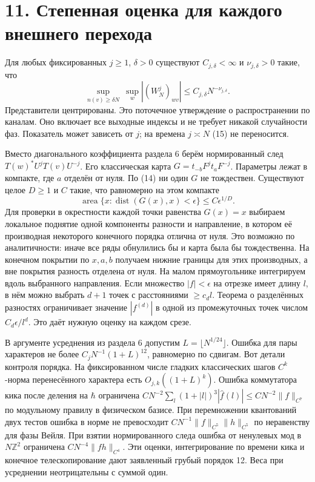 \documentclass[11pt,a4paper]{article}
\newcommand{\sect}[1]{\section*{\sffamily\color{ink}#1}}
\begin{document}
\newpage
\sect{11. Степенная оценка для каждого внешнего перехода}
Для любых фиксированных $j\ge1$, $\delta>0$ существуют $C_{j,\delta}<\infty$ и $\nu_{j,\delta}>0$ такие, что
\[
 \boxed{\sup_{n(v)\ge\delta N}\ \sup_w |(W_N^j)_{wv}|
       \le C_{j,\delta}N^{-\nu_{j,\delta}}.}                              \tag{15}
\]
Представители центрированы. Это поточечное утверждение о распространении по каналам. Оно включает все выходные индексы и не требует никакой случайности фаз. Показатель может зависеть от $j$; на времена $j\asymp N$ (15) не переносится.

Вместо диагонального коэффициента раздела 6 берём нормированный след $T(w)^*U^jT(v)U^{-j}$. Его классическая карта $G=t_{-b}F^jt_a F^{-j}$. Параметры лежат в компакте, где $a$ отделён от нуля. По (14) ни один $G$ не тождествен. Существуют целое $D\ge1$ и $C$ такие, что равномерно на этом компакте
\[
 \operatorname{area}\{x:\operatorname{dist}(G(x),x)<\epsilon\}
 \le C\epsilon^{1/D}.
\]
Для проверки в окрестности каждой точки равенства $G(x)=x$ выбираем локальное поднятие одной компоненты разности и направление, в котором её производная некоторого конечного порядка отлична от нуля. Это возможно по аналитичности: иначе все ряды обнулились бы и карта была бы тождественна. На конечном покрытии по $x,a,b$ получаем нижние границы для этих производных, а вне покрытия разность отделена от нуля. На малом прямоугольнике интегрируем вдоль выбранного направления. Если множество $|f|<\epsilon$ на отрезке имеет длину $l$, в нём можно выбрать $d+1$ точек с расстояниями $\ge c_d l$. Теорема о разделённых разностях ограничивает значение $|f^{(d)}|$ в одной из промежуточных точек числом $C_d\epsilon/l^d$. Это даёт нужную оценку на каждом срезе.

В аргументе усреднения из раздела 6 допустим $L=\lfloor N^{1/24}\rfloor$. Ошибка для пары характеров не более $C_jN^{-1}(1+L)^{12}$, равномерно по сдвигам. Вот детали контроля порядка. На фиксированном числе гладких классических шагов $C^k$-норма перенесённого характера есть $O_{j,k}((1+L)^k)$. Ошибка коммутатора кика после деления на $\hbar$ ограничена $C N^{-2}\sum_l(1+|l|)^3|\widehat f(l)|\le C N^{-2}\|f\|_{C^7}$ по модульному правилу в физическом базисе. При перемножении квантований двух тестов ошибка в норме не превосходит $C N^{-1}\|f\|_{C^5}\|h\|_{C^5}$ по неравенству для фазы Вейля. При взятии нормированного следа ошибка от ненулевых мод в $N\mathbb Z^2$ ограничена $C N^{-4}\|fh\|_{C^4}$. Эти оценки, интегрирование по времени кика и конечное телескопирование дают заявленный грубый порядок 12. Веса при усреднении неотрицательны с суммой один.
\end{document}
